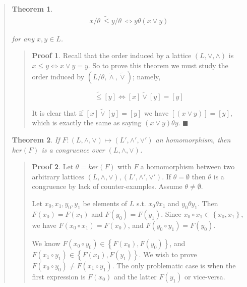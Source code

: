 \documentclass[a4paper, 12pt]{article}
\newtheorem{theorem}{Theorem}
\theoremstyle{definition}
\theoremstyle{definition}
\theoremstyle{definition}
\newtheorem{pro}{Proof}
\begin{document}
\begin{quote}
\begin{theorem}
    \begin{align*}
        x / \theta ~ \widetilde{ \leq } y / \theta  ~ \iff y \theta (x \lor  y)
    \end{align*}

    for any $x, y \in L$.
\end{theorem}


\small
\begin{quote}

\begin{pro}
Recall that the order induced by a lattice $(L, \lor , \land )$
is $x \leq y \iff x \lor  y = y$. So to prove this theorem we must study
the order induced by $(L / \theta, \widetilde{ \land  }, \widetilde{  \lor   }
) $; namely, 

\begin{equation*}
    [x] \widetilde{ \leq }  [y] \iff [x] \widetilde{ \lor  } [y] = [y]
\end{equation*}

It is clear that if $[x] \widetilde{  \lor   } [y] = [y]$ we have $[(x \lor
y)] = [y]$, which is exactly the same as saying $(x\lor y)\theta y$. $\blacksquare$
\end{pro}

\end{quote}
\normalsize


\begin{theorem}
    If $F : (L, \land , \lor ) \mapsto (L', \land ', \lor ')$ an homomorphism,
    then $ker(F)$ is a congruence over $(L, \land , \lor )$.
\end{theorem}


\small
\begin{quote}
\begin{pro}
    
Let $\theta = ker(F)$ with $F$ a homomorphism between two
arbitrary lattices $(L, \land , \lor ), (L', \land ', \lor ')$. If $\theta =
\emptyset$ then $\theta$ is a congruence by lack of counter-examples. Assume
$\theta \neq \emptyset$.

Let $x_0, x_1, y_0, y_1$ be elements of $L$ s.t. $x_0 \theta x_1$ and $y_0
\theta y_1$. Then $F(x_0) = F(x_1)$ and $F(y_0) = F(y_1)$.
Since $x_0 \circ x_1 \in \left\{ x_0, x_1 \right\} $, we have 
$F(x_0 \circ x_1) = F(x_0)$, and $F(y_0 \circ y_1) = F(y_0)$.

We know $F(x_0 \circ y_0) \in \left\{ F(x_0), F(y_0) \right\} $, and $F(x_1
\circ y_1) \in \left\{ F(x_1), F(y_1) \right\} $. We wish to prove $F(x_0 \circ
y_0) \neq F(x_1 \circ y_1)$. The only problematic case is when the first
expression is $F(x_0)$ and the latter $F(y_1)$ or vice-versa.


\end{pro}
\end{quote}
\end{quote}
\end{document}
